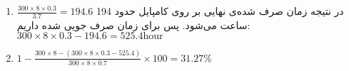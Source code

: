 \begin{enumerate}[leftmargin=0cm,itemindent=.5cm,label=\alph*.]
    \item $\frac{300 \times 8 \times 0.3}{3.7} = 194.6$
    در نتیجه زمان صرف شده‌ی نهایی بر روی کامپایل حدود 194 ساعت می‌شود. پس برای زمان صرف جویی شده داریم:
    $300 \times 8 \times 0.3 - 194.6 = 525.4 \text{hour}$
    \item $1 - \frac{300 \times 8-(300 \times 8 \times 0.3-525.4)}{300 \times 8 \times 0.7} \times 100 = 31.27\%$
\end{enumerate}